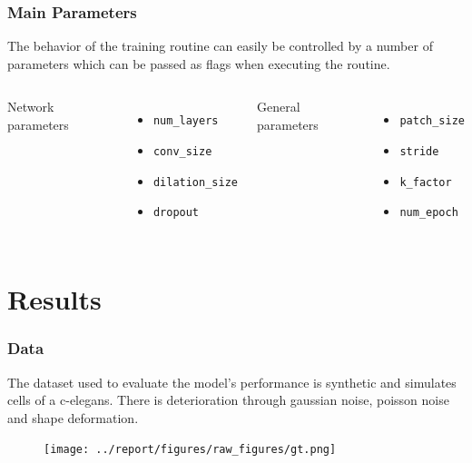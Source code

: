 \documentclass{beamer}
\begin{document}
\begin{frame}
    \frametitle{Main Parameters}
    The behavior of the training routine can easily be controlled by a number of parameters which can be passed as flags when executing the routine.
    \vspace{30pt}
    \begin{columns}[t]
            Network parameters
            \begin{itemize}
                \item \texttt{num\_layers}
                \item \texttt{conv\_size}
                \item \texttt{dilation\_size}
                \item \texttt{dropout}
            \end{itemize}
            General parameters
            \begin{itemize}
                \item \texttt{patch\_size}
                \item \texttt{stride}
                \item \texttt{k\_factor}
                \item \texttt{num\_epoch}
            \end{itemize}
    \end{columns}
\end{frame}

\section{Results}
\begin{frame}
    \frametitle{Data}
    The dataset used to evaluate the model's performance is synthetic and simulates cells of a c-elegans. There is deterioration through gaussian noise, poisson noise and shape deformation.
    \begin{figure}
        \texttt{[image: ../report/figures/raw\_figures/gt.png]}
    \end{figure}
\end{frame}
\end{document}
